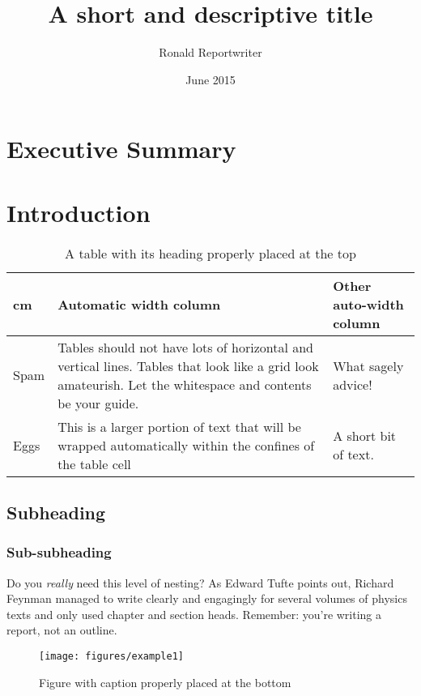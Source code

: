 \documentclass[10pt, letterpaper, final, twoside, onecolumn, article]{memoir}%
\title{A short and descriptive title}
\author{Ronald Reportwriter}
\date{June 2015}
\begin{document}
\maketitle


\frontmatter
\tableofcontents* %
\clearpage
\listoffigures
\clearpage
\listoftables
\clearpage


\chapter{Executive Summary}
\lipsum[1-5]


\mainmatter
\chapter{Introduction}
\lipsum[1-2]

\begin{table}[htdp]
\footnotesize %
\caption{A table with its heading properly placed at the top}
\begin{center}
\begin{tabularx}{\textwidth}{>{\raggedright\arraybackslash}p{1.5cm}>{\raggedright\arraybackslash}X>{\raggedright\arraybackslash}X}
\toprule
1.5 cm & Automatic width column & Other auto-width column \\
\midrule
Spam & Tables should not have lots of horizontal and vertical lines. Tables that look like a grid look amateurish. Let the whitespace and contents be your guide. & What sagely advice!\\

Eggs & This is a larger portion of text that will be wrapped automatically within the confines of the table cell & A short bit of text. \\

\bottomrule
\end{tabularx}
\end{center}
\label{tb:ex1}
\end{table}%


\section{Subheading}
\lipsum[4]

\subsection{Sub-subheading}
Do you \emph{really} need this level of nesting? As Edward Tufte points out, Richard Feynman managed to write clearly and engagingly for several volumes of physics texts and only used chapter and section heads. Remember: you're writing a report, not an outline.

\lipsum[7]

\begin{figure}[htbp]
\begin{center}
\texttt{[image: figures/example1]}


\caption{Figure with caption properly placed at the bottom}
\label{fig:ex1}
\end{center}
\end{figure}
\end{document}

